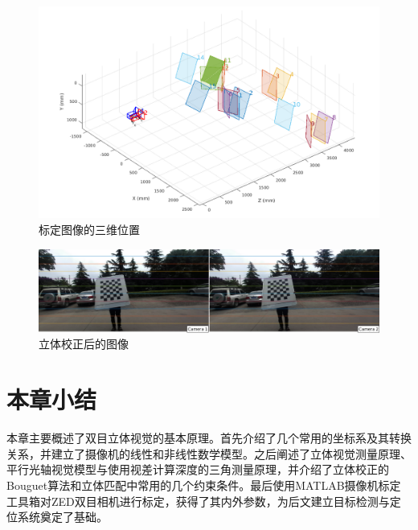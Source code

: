 \begin{figure}[!htb] %
	\centering
	\includegraphics[width=5in]{figures/2_2_extrinsics}
	\caption{标定图像的三维位置}\label{fig:2_2_extrinsics}
\end{figure}

\begin{figure}[!htb] %
	\centering
	\includegraphics[width=6in]{figures/2_2_rectified_image}
	\caption{立体校正后的图像}\label{fig:2_2_rectified_image}
\end{figure}



\section{本章小结}
本章主要概述了双目立体视觉的基本原理。首先介绍了几个常用的坐标系及其转换关系，并建立了摄像机的线性和非线性数学模型。之后阐述了立体视觉测量原理、平行光轴视觉模型与使用视差计算深度的三角测量原理，并介绍了立体校正的Bouguet算法和立体匹配中常用的几个约束条件。最后使用MATLAB摄像机标定工具箱对ZED双目相机进行标定，获得了其内外参数，为后文建立目标检测与定位系统奠定了基础。









